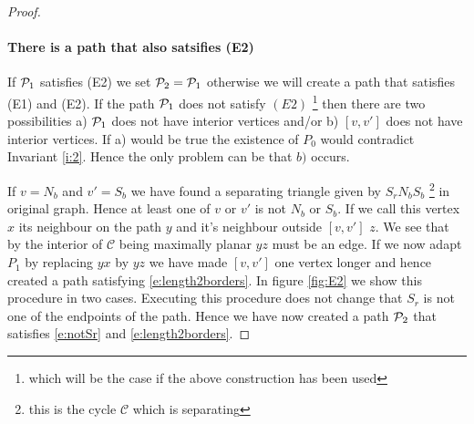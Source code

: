 \documentclass[a4paper]{article}
\theoremstyle{definition}
\newcommand{\scr}[1]{\mathcal{#1}}
\newcommand{\C}{\scr C}
\begin{document}
\begin{proof}
\paragraph{There is a path that also satsifies (E2)}
If $\P_1$ satisfies (E2) we set $\P_2 = \P_1$ otherwise we will create a path that satisfies (E1) and (E2). 
If the path $\P_1$ does not satisfy $(E2)$ \footnote{which will be the case if the above construction has been used} then there are two possibilities  a) $\P_1$ does not have interior vertices and/or b) $[v,v']$ does not have interior vertices. If a) would be true the existence of $P_0$ would contradict Invariant \ref{i:2}. Hence the only problem can be that $b)$ occurs. 

If $v=N_b$ and $v'=S_b$ we have found a separating triangle given by $S_rN_bS_b$ \footnote{this is the cycle $\C$ which is separating} in original graph. Hence at least one of $v$ or $v'$ is not $N_b$ or $S_b$. If we call this vertex $x$ its neighbour on the path $y$ and it's neighbour outside $[v,v']$ $z$. We see that by the interior of $\C$ being maximally planar $yz$ must be an edge. If we now adapt $P_1$ by replacing $yx$ by $yz$ we have made $[v,v']$ one vertex longer and hence created a path satisfying \ref{e:length2borders}. In figure \ref{fig:E2} we show this procedure in two cases. Executing this procedure does not change that $S_r$ is not one of the endpoints of the path. Hence we have now created a path $\P_2$ that satisfies \ref{e:notSr} and \ref{e:length2borders}.


\end{proof}
\end{document}
